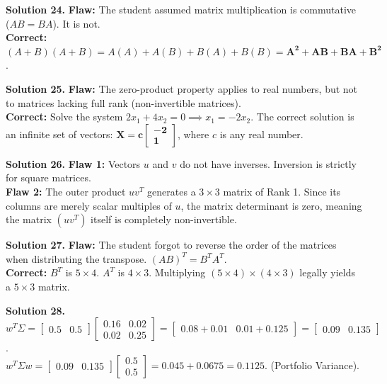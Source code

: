 \documentclass[11pt]{article}
\begin{document}
\vspace{0.2cm}\noindent\textbf{Solution 24.}
\textbf{Flaw:} The student assumed matrix multiplication is commutative ($AB = BA$). It is not.\\
\textbf{Correct:} $(A+B)(A+B) = A(A) + A(B) + B(A) + B(B) = \mathbf{A^2 + AB + BA + B^2}$.

\vspace{0.2cm}\noindent\textbf{Solution 25.}
\textbf{Flaw:} The zero-product property applies to real numbers, but not to matrices lacking full rank (non-invertible matrices). \\
\textbf{Correct:} Solve the system $2x_1 + 4x_2 = 0 \implies x_1 = -2x_2$. The correct solution is an infinite set of vectors: $\mathbf{X = c\begin{bmatrix} -2 \\ 1 \end{bmatrix}}$, where $c$ is any real number.

\vspace{0.2cm}\noindent\textbf{Solution 26.}
\textbf{Flaw 1:} Vectors $u$ and $v$ do not have inverses. Inversion is strictly for square matrices.\\
\textbf{Flaw 2:} The outer product $uv^T$ generates a $3 \times 3$ matrix of Rank 1. Since its columns are merely scalar multiples of $u$, the matrix determinant is zero, meaning the matrix $(uv^T)$ itself is completely non-invertible.

\vspace{0.2cm}\noindent\textbf{Solution 27.}
\textbf{Flaw:} The student forgot to reverse the order of the matrices when distributing the transpose. $(AB)^T = B^T A^T$.\\
\textbf{Correct:} $B^T$ is $5 \times 4$. $A^T$ is $4 \times 3$. Multiplying $(5 \times 4) \times (4 \times 3)$ legally yields a \textbf{$5 \times 3$} matrix.

\vspace{0.2cm}\noindent\textbf{Solution 28.}
$w^T \Sigma = \begin{bmatrix} 0.5 & 0.5 \end{bmatrix} \begin{bmatrix} 0.16 & 0.02 \\ 0.02 & 0.25 \end{bmatrix} = \begin{bmatrix} 0.08+0.01 & 0.01+0.125 \end{bmatrix} = \begin{bmatrix} 0.09 & 0.135 \end{bmatrix}$.\\
$w^T \Sigma w = \begin{bmatrix} 0.09 & 0.135 \end{bmatrix} \begin{bmatrix} 0.5 \\ 0.5 \end{bmatrix} = 0.045 + 0.0675 = \mathbf{0.1125}$. (Portfolio Variance).
\end{document}

